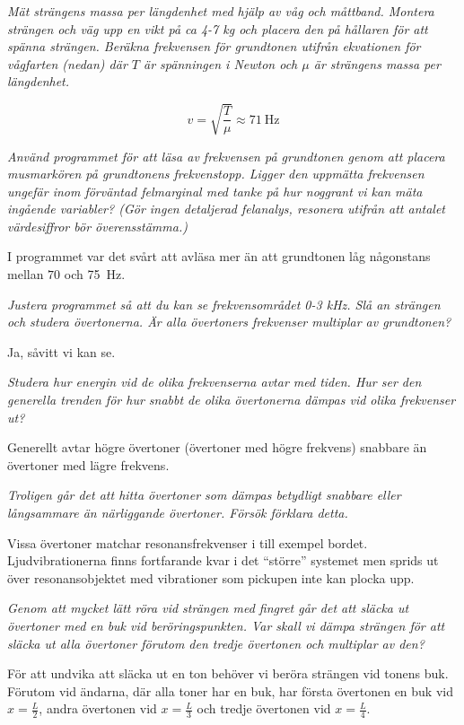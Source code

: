 \documentclass[a4paper,12pt]{article}  %
\begin{document}
\emph{Mät strängens massa per längdenhet med hjälp av våg och måttband. Montera
  strängen och väg upp en vikt på ca 4-7 kg och placera den på hållaren för att
  spänna strängen. Beräkna frekvensen för grundtonen utifrån ekvationen för
  vågfarten (nedan) där $T$ är spänningen i Newton och $\mu$ är strängens massa
  per längdenhet.}

\begin{equation*}
  v = \sqrt{\frac{T}{\mu}} \approx \SI[scientific-notation=false]{71}{\hertz}
\end{equation*}

\emph{Använd programmet för att läsa av frekvensen på grundtonen genom att
  placera musmarkören på grundtonens frekvenstopp. Ligger den uppmätta
  frekvensen ungefär inom förväntad felmarginal med tanke på hur noggrant vi kan
  mäta ingående variabler? (Gör ingen detaljerad felanalys, resonera utifrån att
  antalet värdesiffror bör överensstämma.)}

I programmet var det svårt att avläsa mer än att grundtonen låg någonstans
mellan $70$ och \SI[scientific-notation=false]{75}{\hertz}.

\emph{Justera programmet så att du kan se frekvensområdet 0-3 kHz. Slå an
  strängen och studera övertonerna. Är alla övertoners frekvenser multiplar av
  grundtonen?}

Ja, såvitt vi kan se.

\emph{Studera hur energin vid de olika frekvenserna avtar med tiden. Hur ser den
  generella trenden för hur snabbt de olika övertonerna dämpas vid olika
  frekvenser ut?}

Generellt avtar högre övertoner (övertoner med högre frekvens) snabbare än
övertoner med lägre frekvens.

\emph{Troligen går det att hitta övertoner som dämpas betydligt snabbare eller
  långsammare än närliggande övertoner. Försök förklara detta.}

Vissa övertoner matchar resonansfrekvenser i till exempel bordet.
Ljudvibrationerna finns fortfarande kvar i det ``större'' systemet men sprids ut
över resonansobjektet med vibrationer som pickupen inte kan plocka upp.

\emph{Genom att mycket lätt röra vid strängen med fingret går det att släcka ut
  övertoner med en buk vid beröringspunkten. Var skall vi dämpa strängen för att
  släcka ut alla övertoner förutom den tredje övertonen och multiplar av den?}

För att undvika att släcka ut en ton behöver vi beröra strängen vid tonens buk.
Förutom vid ändarna, där alla toner har en buk, har första övertonen en buk vid
$x=\frac{L}{2}$, andra övertonen vid $x=\frac{L}{3}$ och tredje övertonen vid
$x=\frac{L}{4}$.
\end{document}
